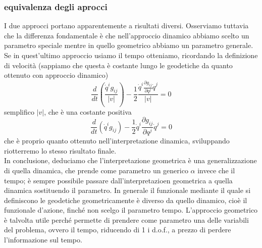 \documentclass[
10pt, %
a4paper, %
oneside, %
headinclude,footinclude, %
BCOR5mm, %
]{scrartcl}
\begin{document}
\subsubsection{equivalenza degli aprocci}
I due approcci portano apparentemente a risultati diversi. Osserviamo tuttavia che la differenza fondamentale è che nell'approccio dinamico abbiamo scelto un parametro speciale mentre in quello geometrico abbiamo un parametro generale. Se in quest'ultimo approccio usiamo il tempo otteniamo, ricordando la definizione di velocità (sappiamo che questa è costante lungo le geodetiche da quanto ottenuto con approccio dinamico)
\[\frac{d}{dt}\left(\frac{\dot{q}^ig_{ij}}{|v|}\right)-\frac{1}{2}\frac{\dot{q}^i\frac{\partial g_{ij}}{\partial q^j}\dot{q}^j}{|v|} = 0\]
semplifico \(|v|\), che è una costante positiva
\[\frac{d}{dt}\left({\dot{q}^ig_{ij}}\right)-\frac{1}{2}{\dot{q}^i\frac{\partial g_{ij}}{\partial q^j}\dot{q}^j} = 0\]
che è proprio quanto ottenuto nell'interpretazione dinamica, sviluppando riotterremo lo stesso risultato finale.\\
In conclusione, deduciamo che l'interpretazione geometrica è una generalizzazione di quella dinamica, che prende come parametro un generico $\alpha$ invece che il tempo; è sempre possibile passare dall'interpretazioen geometrica a quella dinamica sostituendo il parametro. In generale il funzionale mediante il quale si definiscono le geodetiche geometricamente è diverso da quello dinamico, cioè il funzionale d'azione, finché non scelgo il parametro tempo. L'approccio geometrico è talvolta utile perché permette di prendere come parametro una delle variabili del problema, ovvero il tempo, riducendo di 1 i d.o.f., a prezzo di perdere l'informazione sul tempo.  
\end{document}
